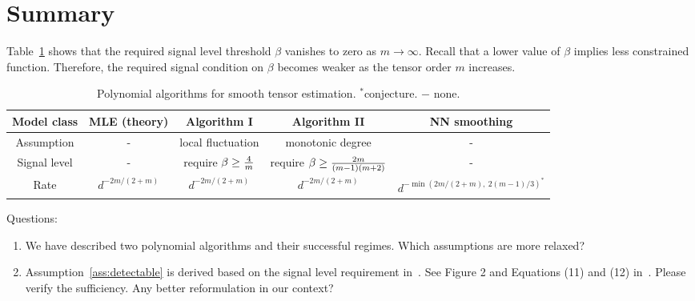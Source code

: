 \documentclass[10pt]{article}
\theoremstyle{definition}
\theoremstyle{definition}
\theoremstyle{definition}
\begin{document}
\section{Summary}
Table~\ref{table:2} shows that the required signal level threshold $\beta$ vanishes to zero as $m\to \infty$. Recall that a lower value of $\beta$ implies less constrained function. Therefore, the required signal condition on $\beta$ becomes weaker as the tensor order $m$ increases. 

\begin{table}[H]
\centering
\begin{tabular}{ccccc}
Model class & MLE (theory) &Algorithm I & Algorithm II & NN smoothing\\
\hline
Assumption & - & local fluctuation & monotonic degree& -\\
Signal level& - & require $\beta \geq {4\over m}$ & require $\beta \geq {2m \over (m-1)(m+2)}$ &-\\
Rate &$d^{-2m/(2+m)}$ & $d^{-2m/(2+m)}$ &$d^{-2m/(2+m)}$& $d^{-\min(2m/(2+m),\ 2(m-1)/3)}^{*}$ \\
\hline
\end{tabular}
\caption{Polynomial algorithms for smooth tensor estimation. $^*$conjecture. $-$ none. }\label{table:2} 
\end{table}

Questions:
\begin{enumerate}
\item We have described two polynomial algorithms and their successful regimes. Which assumptions are more relaxed? 
\item Assumption~\ref{ass:detectable} is derived based on the signal level requirement in~\cite{han2020exact}. See Figure 2 and Equations (11) and (12) in~\cite{han2020exact}. Please verify the sufficiency. Any better reformulation in our context? 
\end{enumerate}



\end{document}
